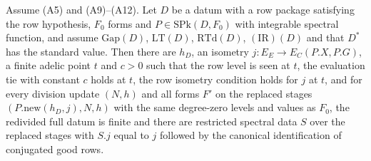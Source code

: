 \begin{proposition}\label{pf:baselat1:speclevel}
Assume (A5) and (A9)--(A12). Let $D$ be a datum with a row package satisfying the row hypothesis, $F_0$ forms and
$P\in\mathrm{SPk}(D,F_0)$ with integrable spectral function, and assume $\mathrm{Gap}(D)$, $\mathrm{LT}(D)$,
$\mathrm{RTd}(D)$, $(\mathrm{IR})(D)$ and that $D^*$ has the standard value. Then there are $h_D$, an isometry
$j\colon E_E\to E_C(P.X,P.G)$, a finite adelic point $t$ and $c>0$ such that the row level is seen at $t$, the
evaluation tie with constant $c$ holds at $t$, the row isometry condition holds for $j$ at $t$, and for every
division update $(N,h)$ and all forms $F'$ on the replaced stages $(P.\mathrm{new}(h_D,j),N,h)$ with the same
degree-zero levels and values as $F_0$, the redivided full datum is finite and there are restricted spectral data
$S$ over the replaced stages with $S.j$ equal to $j$ followed by the canonical identification of conjugated good
rows.
\end{proposition}

